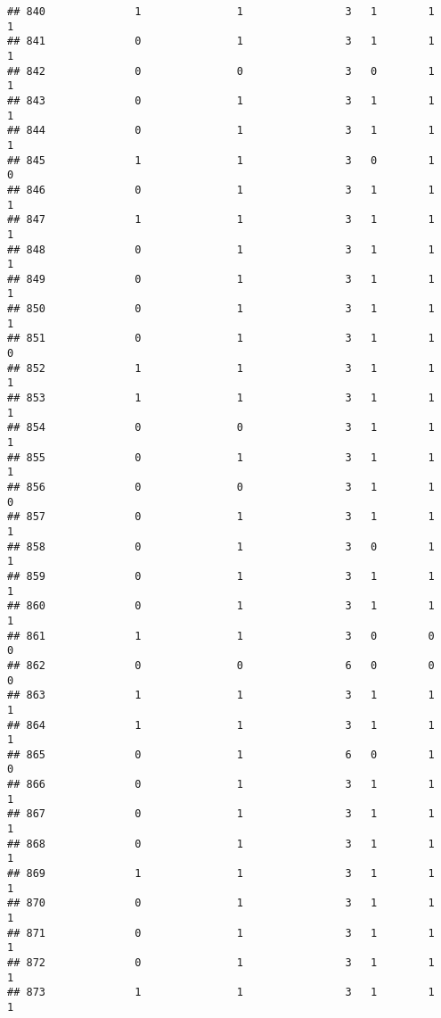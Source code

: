 \documentclass[]{article}
\begin{document}
\begin{verbatim}
## 840              1               1                3   1        1        1
## 841              0               1                3   1        1        1
## 842              0               0                3   0        1        1
## 843              0               1                3   1        1        1
## 844              0               1                3   1        1        1
## 845              1               1                3   0        1        0
## 846              0               1                3   1        1        1
## 847              1               1                3   1        1        1
## 848              0               1                3   1        1        1
## 849              0               1                3   1        1        1
## 850              0               1                3   1        1        1
## 851              0               1                3   1        1        0
## 852              1               1                3   1        1        1
## 853              1               1                3   1        1        1
## 854              0               0                3   1        1        1
## 855              0               1                3   1        1        1
## 856              0               0                3   1        1        0
## 857              0               1                3   1        1        1
## 858              0               1                3   0        1        1
## 859              0               1                3   1        1        1
## 860              0               1                3   1        1        1
## 861              1               1                3   0        0        0
## 862              0               0                6   0        0        0
## 863              1               1                3   1        1        1
## 864              1               1                3   1        1        1
## 865              0               1                6   0        1        0
## 866              0               1                3   1        1        1
## 867              0               1                3   1        1        1
## 868              0               1                3   1        1        1
## 869              1               1                3   1        1        1
## 870              0               1                3   1        1        1
## 871              0               1                3   1        1        1
## 872              0               1                3   1        1        1
## 873              1               1                3   1        1        1

\end{verbatim}
\end{document}
